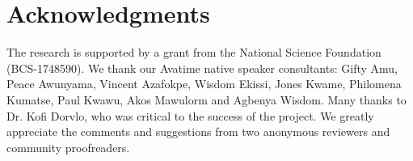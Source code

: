 \documentclass[output=paper]{langscibook}
\begin{document}
\section*{Acknowledgments}
The research is supported by a grant from the National Science Foundation (BCS-1748590). We thank our Avatime native speaker consultants: Gifty Amu, Peace Awunyama, Vincent Azafokpe, Wisdom Ekissi, Jones Kwame, Philomena Kumatse, Paul Kwawu, Akos Mawulorm and Agbenya Wisdom. Many thanks to Dr. Kofi Dorvlo, who was critical to the success of the project. We greatly appreciate the comments and suggestions from two anonymous reviewers and community proofreaders.


{\sloppy\printbibliography[heading=subbibliography,notkeyword=this]}
\end{document}
